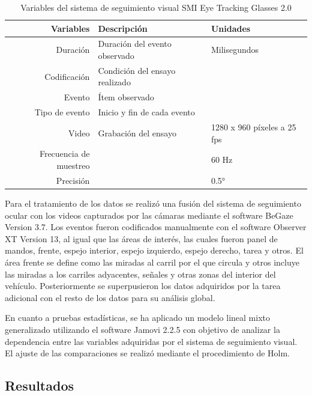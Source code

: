 \begin{table}[h]
\centering
\begin{tabular}{rll}
\textbf{Variables}     & \textbf{Descripción}           & \textbf{Unidades}           \\ \hline
Duración               & Duración del evento observado  & Milisegundos                \\ \hline
Codificación           & Condición del ensayo realizado &                             \\ \hline
Evento                 & Ítem observado                 &                             \\ \hline
Tipo de evento         & Inicio y fin de cada evento    &                             \\ \hline
Video                  & Grabación del ensayo           & 1280 x 960 píxeles a 25 fps \\ \hline
Frecuencia de muestreo &                                & 60 Hz                       \\ \hline
Precisión              &                                & 0.5°                       \\ \hline
\end{tabular}
\caption{Variables del sistema de seguimiento visual SMI Eye Tracking Glasses 2.0}
\label{tab:3.13}
\end{table}

Para el tratamiento de los datos se realizó una fusión del sistema de seguimiento ocular con los videos capturados por las cámaras mediante el software BeGaze Version 3.7. Los eventos fueron codificados manualmente con el software Observer XT Version 13, al igual que las áreas de interés, las cuales fueron panel de mandos, frente, espejo interior, espejo izquierdo, espejo derecho, tarea y otros. El área frente se define como las miradas al carril por el que circula y otros incluye las miradas a los carriles adyacentes, señales y otras zonas del interior del vehículo. Posteriormente se superpusieron los datos adquiridos por la tarea adicional con el resto de los datos para su análisis global.

En cuanto a pruebas estadísticas, se ha aplicado un modelo lineal mixto generalizado utilizando el software Jamovi 2.2.5 con objetivo de analizar la dependencia entre las variables adquiridas por el sistema de seguimiento visual. El ajuste de las comparaciones se realizó mediante el procedimiento de Holm.

\subsection{Resultados}\label{323}

